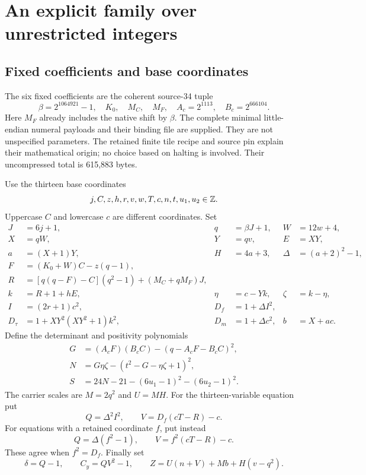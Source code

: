 \section{An explicit family over unrestricted integers}\label{sec:integer}
\subsection{Fixed coefficients and base coordinates}
The six fixed coefficients are the coherent source-34 tuple
\[
 \beta=2^{1064921}-1,\quad K_0,\quad M_C,\quad M_F,
 \quad A_c=2^{1113},\quad B_c=2^{666104}.
\]
Here $M_F$ already includes the native shift by $\beta$. The complete
minimal little-endian numeral payloads and their binding file are supplied.
They are not unspecified parameters. The retained finite tile recipe and
source pin explain their mathematical origin; no choice based on halting
is involved. Their uncompressed total is 615,883 bytes.

Use the thirteen base coordinates
\[
 j,C,z,h,r,v,w,T,c,n,t,u_1,u_2\in\mathbb Z.
\]
Uppercase $C$ and lowercase $c$ are different coordinates. Set
\begin{align}
 J&=6j+1,&q&=\beta J+1,&W&=12w+4,\nonumber\\
 X&=qW,&Y&=qv,&E&=XY,\nonumber\\
 a&=(X+1)Y,&H&=4a+3,&\Delta&=(a+2)^2-1,\label{eq:front}\\
 F&=(K_0+W)C-z(q-1),\nonumber\\
 R&=[q(q-F)-C](q^2-1)+(M_C+qM_F)J,\nonumber\\
 k&=R+1+hE,&\eta&=c-Yk,&\zeta&=k-\eta,\label{eq:rank}\\
 I&=(2r+1)c^2,&D_f&=1+\Delta I^2,\nonumber\\
 D_\tau&=1+XY^2(XY^2+1)k^2,&D_m&=1+\Delta c^2,&b&=X+ac.
 \label{eq:radicands}
\end{align}
Define the determinant and positivity polynomials
\begin{align}
 G&=(A_cF)(B_cC)-(q-A_cF-B_cC)^2,\nonumber\\
 N&=G\eta\zeta-(t^2-G-\eta\zeta+1)^2,\nonumber\\
 S&=24N-21-(6u_1-1)^2-(6u_2-1)^2.\label{eq:guard}
\end{align}
The carrier scales are $M=2q^2$ and $U=MH$.
For the thirteen-variable equation put
\[
 Q=\Delta^2 I^2,\qquad V=D_f(cT-R)-c.
\]
For equations with a retained coordinate $f$, put instead
\begin{equation}
 Q=\Delta(f^2-1),\qquad V=f^2(cT-R)-c.\label{eq:retainedf}
\end{equation}
These agree when $f^2=D_f$. Finally set
\begin{equation}
 \delta=Q-1,\qquad C_y=QV^2-1,\qquad
 Z=U(n+V)+Mb+H(v-q^2).\label{eq:carrier}
\end{equation}

